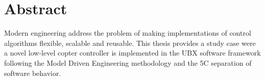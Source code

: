 


\begingroup
\let\clearpage\relax
\let\cleardoublepage\relax
\let\cleardoublepage\relax

\chapter*{Abstract}
Modern engineering address the problem of making implementations of control algorithms flexible, scalable and reusable. This thesis provides a study case were a novel low-level copter controller is implemented in the UBX software framework following the Model Driven Engineering methodology and the 5C separation of software behavior.

\endgroup			

\vfill